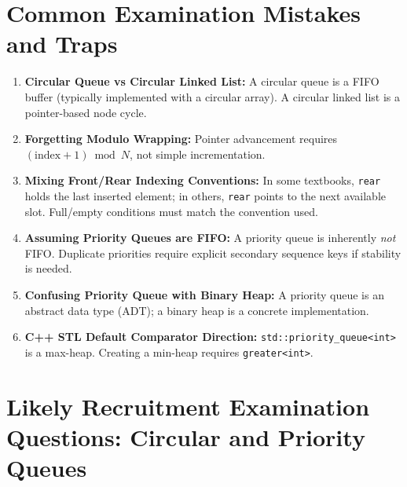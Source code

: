 \section{Common Examination Mistakes and Traps}

\begin{enumerate}
    \item \textbf{Circular Queue vs Circular Linked List:} A circular queue is a FIFO buffer (typically implemented with a circular array). A circular linked list is a pointer-based node cycle.
    \item \textbf{Forgetting Modulo Wrapping:} Pointer advancement requires $(\text{index} + 1) \bmod N$, not simple incrementation.
    \item \textbf{Mixing Front/Rear Indexing Conventions:} In some textbooks, \texttt{rear} holds the last inserted element; in others, \texttt{rear} points to the next available slot. Full/empty conditions must match the convention used.
    \item \textbf{Assuming Priority Queues are FIFO:} A priority queue is inherently \emph{not} FIFO. Duplicate priorities require explicit secondary sequence keys if stability is needed.
    \item \textbf{Confusing Priority Queue with Binary Heap:} A priority queue is an abstract data type (ADT); a binary heap is a concrete implementation.
    \item \textbf{C++ STL Default Comparator Direction:} \texttt{std::priority\_queue<int>} is a max-heap. Creating a min-heap requires \texttt{greater<int>}.
\end{enumerate}

\section{Likely Recruitment Examination Questions: Circular and Priority Queues}

